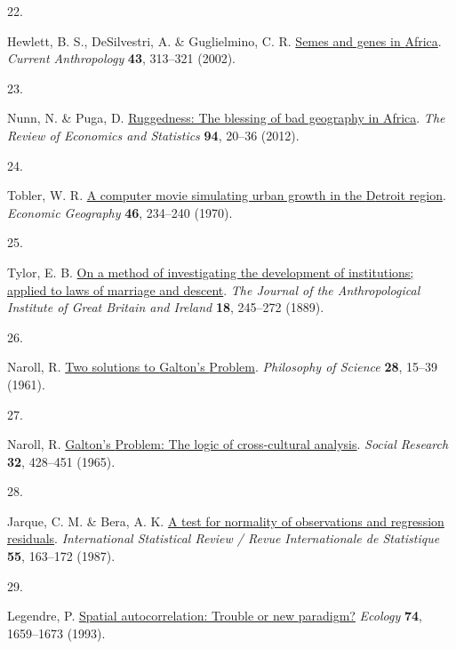 \documentclass[
  man,floatsintext]{apa6}
\newlength{\cslhangindent}
\newlength{\csllabelwidth}
\newlength{\cslentryspacingunit} %
\newenvironment{CSLReferences}[2] %
 {%
  \setlength{\parindent}{0pt}
  \ifodd #1
  \let\oldpar\par
  \def\par{\hangindent=\cslhangindent\oldpar}
  \fi
  \setlength{\parskip}{#2\cslentryspacingunit}
 }%
 {}
\newcommand{\CSLLeftMargin}[1]{\parbox[t]{\csllabelwidth}{#1}}
\newcommand{\CSLRightInline}[1]{\parbox[t]{\linewidth - \csllabelwidth}{#1}\break}
\begin{document}
\begin{CSLReferences}{0}{0}
\leavevmode{}%
\CSLLeftMargin{22. }%
\CSLRightInline{Hewlett, B. S., DeSilvestri, A. \& Guglielmino, C. R. \href{https://doi.org/10.1086/339379}{Semes and genes in {Africa}}. \emph{Current Anthropology} \textbf{43}, 313--321 (2002).}

\leavevmode{}%
\CSLLeftMargin{23. }%
\CSLRightInline{Nunn, N. \& Puga, D. \href{https://doi.org/10.1162/REST_a_00161}{Ruggedness: The blessing of bad geography in {A}frica}. \emph{The Review of Economics and Statistics} \textbf{94}, 20--36 (2012).}

\leavevmode{}%
\CSLLeftMargin{24. }%
\CSLRightInline{Tobler, W. R. \href{https://doi.org/10.2307/143141}{A computer movie simulating urban growth in the {D}etroit region}. \emph{Economic Geography} \textbf{46}, 234--240 (1970).}

\leavevmode{}%
\CSLLeftMargin{25. }%
\CSLRightInline{Tylor, E. B. \href{https://doi.org/10.2307/2842423}{On a method of investigating the development of institutions; applied to laws of marriage and descent}. \emph{The Journal of the Anthropological Institute of Great Britain and Ireland} \textbf{18}, 245--272 (1889).}

\leavevmode{}%
\CSLLeftMargin{26. }%
\CSLRightInline{Naroll, R. \href{https://doi.org/10.1086/287778}{Two solutions to {G}alton's {P}roblem}. \emph{Philosophy of Science} \textbf{28}, 15--39 (1961).}

\leavevmode{}%
\CSLLeftMargin{27. }%
\CSLRightInline{Naroll, R. \href{http://www.jstor.org/stable/40969817}{Galton's {P}roblem: The logic of cross-cultural analysis}. \emph{Social Research} \textbf{32}, 428--451 (1965).}

\leavevmode{}%
\CSLLeftMargin{28. }%
\CSLRightInline{Jarque, C. M. \& Bera, A. K. \href{https://doi.org/10.2307/1403192}{A test for normality of observations and regression residuals}. \emph{International Statistical Review / Revue Internationale de Statistique} \textbf{55}, 163--172 (1987).}

\leavevmode{}%
\CSLLeftMargin{29. }%
\CSLRightInline{Legendre, P. \href{https://doi.org/10.2307/1939924}{Spatial autocorrelation: Trouble or new paradigm?} \emph{Ecology} \textbf{74}, 1659--1673 (1993).}


\end{CSLReferences}
\end{document}
